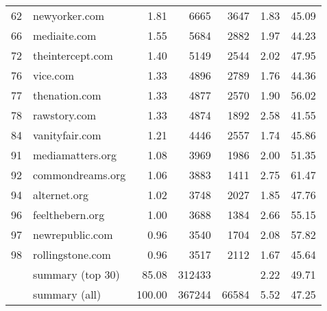 \begin{tabular}{llrrrrr}
62               &          newyorker.com &    1.81 &    6665 &    3647 &         1.83 &         45.09 \\
66               &           mediaite.com &    1.55 &    5684 &    2882 &         1.97 &         44.23 \\
72               &       theintercept.com &    1.40 &    5149 &    2544 &         2.02 &         47.95 \\
76               &               vice.com &    1.33 &    4896 &    2789 &         1.76 &         44.36 \\
77               &          thenation.com &    1.33 &    4877 &    2570 &         1.90 &         56.02 \\
78               &           rawstory.com &    1.33 &    4874 &    1892 &         2.58 &         41.55 \\
84               &         vanityfair.com &    1.21 &    4446 &    2557 &         1.74 &         45.86 \\
91               &       mediamatters.org &    1.08 &    3969 &    1986 &         2.00 &         51.35 \\
92               &       commondreams.org &    1.06 &    3883 &    1411 &         2.75 &         61.47 \\
94               &           alternet.org &    1.02 &    3748 &    2027 &         1.85 &         47.76 \\
96               &        feelthebern.org &    1.00 &    3688 &    1384 &         2.66 &         55.15 \\
97               &        newrepublic.com &    0.96 &    3540 &    1704 &         2.08 &         57.82 \\
98               &       rollingstone.com &    0.96 &    3517 &    2112 &         1.67 &         45.64 \\
& summary (top 30) & 85.08 &  312433 &         &         2.22 &         49.71 \\
& summary (all)    & 100.00 &  367244 &  66584 &         5.52 &         47.25 \\
\bottomrule
\end{tabular}
